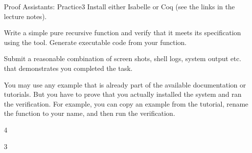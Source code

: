 \documentclass[a4paper]{article}
\begin{document}
\header

\begin{problem}{Proof Assistants: Practice}{3}
Install either Isabelle or Coq (see the links in the lecture notes).

Write a simple pure recursive function and verify that it meets its specification using the tool.
Generate executable code from your function.
\medskip

Submit a reasonable combination of screen shots, shell logs, system output etc. that demonstrates you completed the task.

You may use any example that is already part of the available documentation or tutorials.
But you have to prove that you actually installed the system and ran the verification.
For example, you can copy an example from the tutorial, rename the function to your name, and then run the verification.
\end{problem}


\begin{problem}{}{4}
\end{problem}

\begin{problem}{}{3}
\end{problem}
\end{document}
